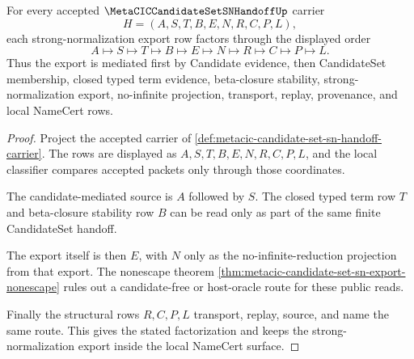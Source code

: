 \begin{theorem}
\label{thm:metacic-candidate-set-sn-handoff-export-factorization}
For every accepted $\MetaCICCandidateSetSNHandoffUp$ carrier
$$
H=(A,S,T,B,E,N,R,C,P,L),
$$
each strong-normalization export row factors through the displayed order
$$
A \longmapsto S \longmapsto T \longmapsto B \longmapsto E \longmapsto N \longmapsto R \longmapsto C \longmapsto P \longmapsto L .
$$
Thus the export is mediated first by Candidate evidence, then CandidateSet membership, closed typed term evidence, beta-closure stability, strong-normalization export, no-infinite projection, transport, replay, provenance, and local NameCert rows.
\end{theorem}
\begin{proof}
Project the accepted carrier of \autoref{def:metacic-candidate-set-sn-handoff-carrier}. The rows are displayed as $A,S,T,B,E,N,R,C,P,L$, and the local classifier compares accepted packets only through those coordinates.

The candidate-mediated source is $A$ followed by $S$. The closed typed term row $T$ and beta-closure stability row $B$ can be read only as part of the same finite CandidateSet handoff.

The export itself is then $E$, with $N$ only as the no-infinite-reduction projection from that export. The nonescape theorem \autoref{thm:metacic-candidate-set-sn-export-nonescape} rules out a candidate-free or host-oracle route for these public reads.

Finally the structural rows $R,C,P,L$ transport, replay, source, and name the same route. This gives the stated factorization and keeps the strong-normalization export inside the local NameCert surface.
\end{proof}

